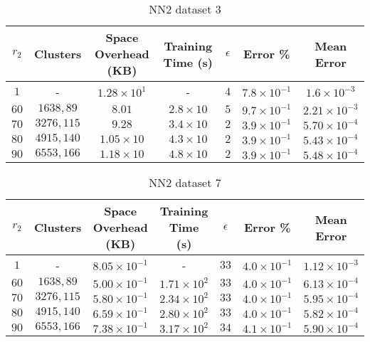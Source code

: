 \begin{adjustwidth}{-1cm}{}
\begin{table}
\caption{NN2 dataset 3}\label{ws23}
\begin{tabular}{ccccccc}
\hline
\toprule
$r_2$ & Clusters & Space Overhead (KB) & Training Time (s) & $\epsilon$ & Error \% & Mean Error\\
\midrule
$1$ & - & $1.28 \times 10^{1}$ & - & $4$ & $7.8 \times 10^{-1}$ & $1.6 \times 10^{-3}$\\
$60$ & $1638, 89$ & $8.01$ & $2.8 \times 10$ & $5$ & $9.7 \times 10^{-1}$ & $2.21 \times 10^{-3}$\\
$70$ & $3276, 115$ & $9.28$ & $3.4 \times 10$ & $2$ & $3.9 \times 10^{-1}$ & $5.70 \times 10^{-4}$\\
$80$ & $4915, 140$ & $1.05 \times 10$ & $4.3 \times 10$ & $2$ & $3.9 \times 10^{-1}$ & $5.43 \times 10^{-4}$\\
$90$ & $6553, 166$ & $1.18 \times 10$ & $4.8 \times 10$ & $2$ & $3.9 \times 10^{-1}$ & $5.48 \times 10^{-4}$\\
\bottomrule
\end{tabular}
\end{table}
\end{adjustwidth}

\par\null\par
\par\null\par

\begin{adjustwidth}{-1cm}{}
\begin{table}
\caption{NN2 dataset 7}\label{ws27}
\begin{tabular}{ccccccc}
\hline
\toprule
$r_2$ & Clusters & Space Overhead (KB) & Training Time (s) & $\epsilon$ & Error \% & Mean Error\\
\midrule
$1$ & - & $8.05 \times 10^{-1}$ & - & $33$ & $4.0 \times 10^{-1}$ & $1.12 \times 10^{-3}$\\
$60$ & $1638, 89$ & $5.00 \times 10^{-1}$ & $1.71 \times 10^2$ & $33$ & $4.0 \times 10^{-1}$ & $6.13 \times 10^{-4}$\\
$70$ & $3276, 115$ & $5.80 \times 10^{-1}$ & $2.34 \times 10^2$ & $33$ & $4.0 \times 10^{-1}$ & $5.95 \times 10^{-4}$\\
$80$ & $4915, 140$ & $6.59 \times 10^{-1}$ & $2.80 \times 10^2$ & $33$ & $4.0 \times 10^{-1}$ & $5.82 \times 10^{-4}$\\
$90$ & $6553, 166$ & $7.38 \times 10^{-1}$ & $3.17 \times 10^2$ & $34$ & $4.1 \times 10^{-1}$ & $5.90 \times 10^{-4}$\\
\bottomrule
\end{tabular}
\end{table}
\end{adjustwidth}

